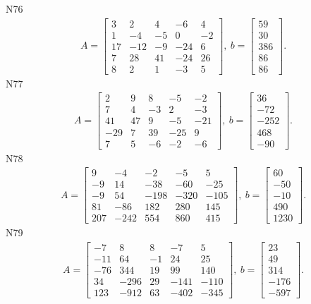 \documentclass[11pt]{report}
\begin{document}
N76
\begin{align*}
 A = \left[\begin{matrix}3 & 2 & 4 & -6 & 4\\1 & -4 & -5 & 0 & -2\\17 & -12 & -9 & -24 & 6\\7 & 28 & 41 & -24 & 26\\8 & 2 & 1 & -3 & 5\end{matrix}\right],
\ b = \left[\begin{matrix}59\\30\\386\\86\\86\end{matrix}\right]. 
 \end{align*}
N77
\begin{align*}
 A = \left[\begin{matrix}2 & 9 & 8 & -5 & -2\\7 & 4 & -3 & 2 & -3\\41 & 47 & 9 & -5 & -21\\-29 & 7 & 39 & -25 & 9\\7 & 5 & -6 & -2 & -6\end{matrix}\right],
\ b = \left[\begin{matrix}36\\-72\\-252\\468\\-90\end{matrix}\right]. 
 \end{align*}
N78
\begin{align*}
 A = \left[\begin{matrix}9 & -4 & -2 & -5 & 5\\-9 & 14 & -38 & -60 & -25\\-9 & 54 & -198 & -320 & -105\\81 & -86 & 182 & 280 & 145\\207 & -242 & 554 & 860 & 415\end{matrix}\right],
\ b = \left[\begin{matrix}60\\-50\\-10\\490\\1230\end{matrix}\right]. 
 \end{align*}
N79
\begin{align*}
 A = \left[\begin{matrix}-7 & 8 & 8 & -7 & 5\\-11 & 64 & -1 & 24 & 25\\-76 & 344 & 19 & 99 & 140\\34 & -296 & 29 & -141 & -110\\123 & -912 & 63 & -402 & -345\end{matrix}\right],
\ b = \left[\begin{matrix}23\\49\\314\\-176\\-597\end{matrix}\right]. 
 \end{align*}
\end{document}
